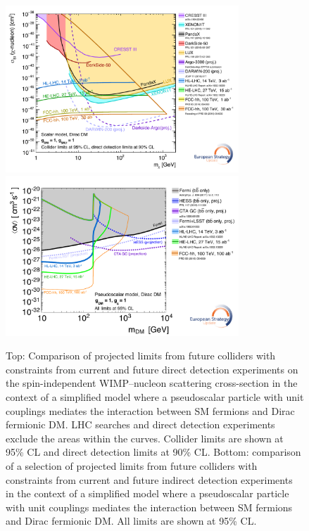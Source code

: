 \documentclass[../report.tex]{subfiles}
\begin{document}
\begin{figure}[!htbp]
    \centering
          \includegraphics[width=0.78\textwidth]{Darkmatter/section2/img/DMCombinationDD_12May19_Internal_V1SInucleon}
        \includegraphics[width=0.78\textwidth]{Darkmatter/section2/img/ID_Formatted_allChannels}
    \caption{Top: Comparison of projected limits from future colliders with constraints from current and future direct detection experiments on the spin-independent WIMP--nucleon scattering cross-section in the context of a simplified model where a pseudoscalar particle with unit couplings mediates the interaction between SM fermions and Dirac fermionic DM. 
    LHC searches and direct detection experiments exclude the areas within the curves.
    Collider limits are shown at 95\% CL and direct detection limits at 90\% CL. 
    Bottom: comparison of a selection of projected limits from future colliders with constraints from current and future indirect detection experiments in the context of a simplified model where a pseudoscalar particle with unit couplings mediates the interaction between SM fermions and Dirac fermionic DM. All limits are shown at 95\% CL. }
    \label{fig:Scalar_CollidersDD}
\end{figure}
\end{document}
